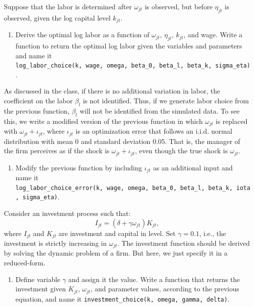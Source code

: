 \documentclass[]{book}
\providecommand{\tightlist}{%
  \setlength{\itemsep}{0pt}\setlength{\parskip}{0pt}}
\begin{document}
Suppose that the labor is determined after \(\omega_{jt}\) is observed,
but before \(\eta_{jt}\) is observed, given the log capital level
\(k_{jt}\).

\begin{enumerate}
\def\labelenumi{\arabic{enumi}.}
\setcounter{enumi}{2}
\tightlist
\item
  Derive the optimal log labor as a function of \(\omega_{jt}\),
  \(\eta_{jt}\), \(k_{jt}\), and wage. Write a function to return the
  optimal log labor given the variables and parameters and name it
  \texttt{log\_labor\_choice(k,\ wage,\ omega,\ beta\_0,\ beta\_l,\ beta\_k,\ sigma\_eta)}.
\end{enumerate}

As discussed in the class, if there is no additional variation in labor,
the coefficient on the labor \(\beta_l\) is not identified. Thus, if we
generate labor choice from the previous function, \(\beta_l\) will not
be identified from the simulated data. To see this, we write a modified
version of the previous function in which \(\omega_{jt}\) is replaced
with \(\omega_{jt} + \iota_{jt}\), where \(\iota_{jt}\) is an
optimization error that follows an i.i.d. normal distribution with mean
0 and standard deviation 0.05. That is, the manager of the firm
perceives as if the shock is \(\omega_{jt} + \iota_{jt}\), even though
the true shock is \(\omega_{jt}\).

\begin{enumerate}
\def\labelenumi{\arabic{enumi}.}
\setcounter{enumi}{3}
\tightlist
\item
  Modify the previous function by including \(\iota_{jt}\) as an
  additional input and name it
  \texttt{log\_labor\_choice\_error(k,\ wage,\ omega,\ beta\_0,\ beta\_l,\ beta\_k,\ iota,\ sigma\_eta)}.
\end{enumerate}

Consider an investment process such that: \[
I_{jt} = (\delta + \gamma \omega_{jt}) K_{jt},
\] where \(I_{jt}\) and \(K_{jt}\) are investment and capital in level.
Set \(\gamma = 0.1\), i.e., the investment is strictly increasing in
\(\omega_{jt}\). The investment function should be derived by solving
the dynamic problem of a firm. But here, we just specify it in a
reduced-form.

\begin{enumerate}
\def\labelenumi{\arabic{enumi}.}
\setcounter{enumi}{4}
\tightlist
\item
  Define variable \(\gamma\) and assign it the value. Write a function
  that returns the investment given \(K_{jt}\), \(\omega_{jt}\), and
  parameter values, according to the previous equation, and name it
  \texttt{investment\_choice(k,\ omega,\ gamma,\ delta)}.
\end{enumerate}
\end{document}
